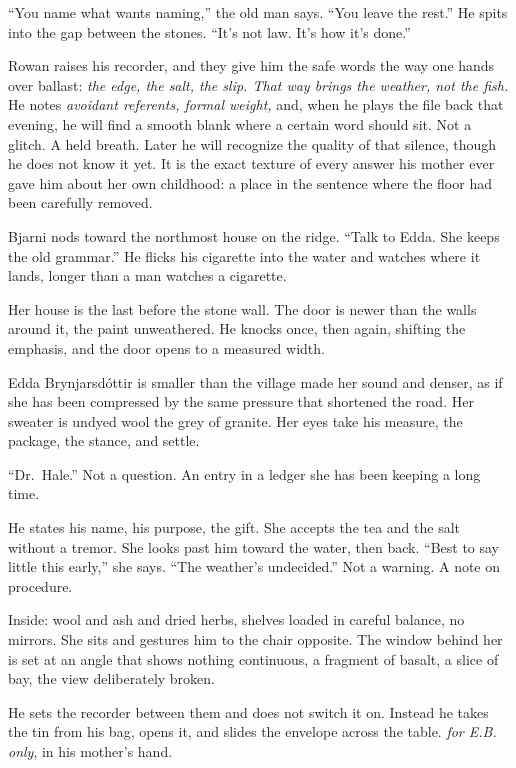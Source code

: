 \documentclass[11pt,oneside]{book}
\newcommand{\sceneline}{%
  \par\vspace{1.2em}
  \begin{center}
    \fontsize{11}{11}\selectfont \textbullet\quad\textbullet\quad\textbullet
  \end{center}
  \vspace{0.6em}\noindent\ignorespaces
}
\begin{document}
``You name what wants naming,'' the old man says. ``You leave the
rest.'' He spits into the gap between the stones. ``It's not law. It's
how it's done.''

Rowan raises his recorder, and they give him the safe words the way one
hands over ballast: \emph{the edge, the salt, the slip. That way brings
the weather, not the fish.} He notes \emph{avoidant referents, formal
weight,} and, when he plays the file back that evening, he will find a
smooth blank where a certain word should sit. Not a glitch. A held
breath. Later he will recognize the quality of that silence, though he
does not know it yet. It is the exact texture of every answer his mother
ever gave him about her own childhood: a place in the sentence where the
floor had been carefully removed.

Bjarni nods toward the northmost house on the ridge. ``Talk to Edda. She
keeps the old grammar.'' He flicks his cigarette into the water and
watches where it lands, longer than a man watches a cigarette.

\sceneline

Her house is the last before the stone wall. The door is newer than the
walls around it, the paint unweathered. He knocks once, then again,
shifting the emphasis, and the door opens to a measured width.

Edda Brynjarsdóttir is smaller than the village made her sound and
denser, as if she has been compressed by the same pressure that
shortened the road. Her sweater is undyed wool the grey of granite. Her
eyes take his measure, the package, the stance, and settle.

``Dr.~Hale.'' Not a question. An entry in a ledger she has been keeping
a long time.

He states his name, his purpose, the gift. She accepts the tea and the
salt without a tremor. She looks past him toward the water, then back.
``Best to say little this early,'' she says. ``The weather's
undecided.'' Not a warning. A note on procedure.

Inside: wool and ash and dried herbs, shelves loaded in careful balance,
no mirrors. She sits and gestures him to the chair opposite. The window
behind her is set at an angle that shows nothing continuous, a fragment
of basalt, a slice of bay, the view deliberately broken.

He sets the recorder between them and does not switch it on. Instead he
takes the tin from his bag, opens it, and slides the envelope across the
table. \emph{for E.B. only}, in his mother's hand.
\end{document}
